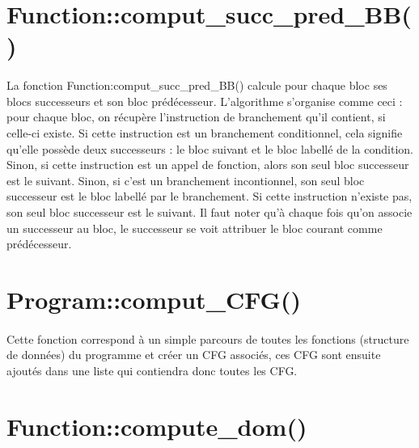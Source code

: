 \documentclass[a4paper,12pt]{report}
\begin{document}
\section{Function::comput\_succ\_pred\_BB()}
\paragraph*{}
La fonction Function:comput\_succ\_pred\_BB() calcule pour chaque bloc ses blocs successeurs et son bloc prédécesseur. 
\newline
\newline
L'algorithme s'organise comme ceci : pour chaque bloc, on récupère l'instruction de branchement qu'il contient, si celle-ci existe. Si cette instruction est un branchement conditionnel, cela signifie qu'elle possède deux successeurs : le bloc suivant et le bloc labellé de la condition. Sinon, si cette instruction est un appel de fonction, alors son seul bloc successeur est le suivant. Sinon, si c'est un branchement incontionnel, son seul bloc successeur est le bloc labellé par le branchement. Si cette instruction n'existe pas, son seul bloc successeur est le suivant. 
\newline
Il faut noter qu'à chaque fois qu'on associe un successeur au bloc, le successeur se voit attribuer le bloc courant comme prédécesseur.



\section{Program::comput\_CFG()}
\paragraph*{}
Cette fonction correspond à un simple parcours de toutes les fonctions (structure de données) du programme et créer un CFG associés, ces CFG sont ensuite ajoutés dans une liste qui contiendra donc toutes les CFG.

\section{Function::compute\_dom()}
\end{document}
